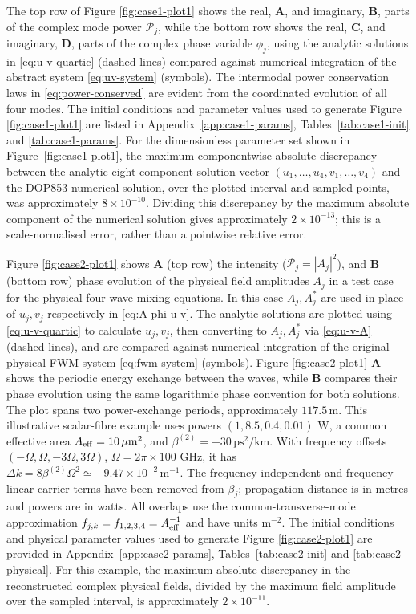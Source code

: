 \documentclass[11pt,a4paper]{article}
\numberwithin{equation}{section}
\begin{document}
The top row of Figure \ref{fig:case1-plot1} shows the real, \textbf{A}, and imaginary, \textbf{B}, parts of the complex mode power $\mathcal{P}_j$,
while the bottom row shows the real, \textbf{C}, and imaginary, \textbf{D}, parts of the complex phase variable $\phi_j$, using the analytic solutions in \eqref{eq:u-v-quartic} (dashed lines) compared against numerical integration of the abstract system \eqref{eq:uv-system} (symbols).
The intermodal power conservation laws in \eqref{eq:power-conserved} are evident from the coordinated evolution of all four modes.
The initial conditions and parameter values used to generate Figure \ref{fig:case1-plot1} are listed in Appendix~\ref{app:case1-params}, Tables~\ref{tab:case1-init} and \ref{tab:case1-params}.
For the dimensionless parameter set shown in Figure~\ref{fig:case1-plot1}, the maximum componentwise absolute discrepancy between the analytic eight-component solution vector $(u_1,\ldots,u_4,v_1,\ldots,v_4)$ and the DOP853 numerical solution, over the plotted interval and sampled points, was approximately $8\times10^{-10}$.
Dividing this discrepancy by the maximum absolute component of the numerical solution gives approximately $2\times10^{-13}$; this is a scale-normalised error, rather than a pointwise relative error.

Figure \ref{fig:case2-plot1} shows \textbf{A} (top row) the intensity ($\mathcal{P}_j=\left|A_j\right|^2$), and \textbf{B} (bottom row) phase evolution of the physical field amplitudes $A_j$ in a test case for the physical four-wave mixing equations.
In this case $A_j, A^*_j$ are used in place of $u_j, v_j$ respectively in \eqref{eq:A-phi-u-v}.
The analytic solutions are plotted using \eqref{eq:u-v-quartic} to calculate $u_j, v_j$, then converting to $A_j, A_j^{*}$ via \eqref{eq:u-v-A} (dashed lines), and are compared against numerical integration of the original physical FWM system \eqref{eq:fwm-system} (symbols).
Figure \ref{fig:case2-plot1} \textbf{A} shows the periodic energy exchange between the waves, while \textbf{B} compares their phase evolution using the same logarithmic phase convention for both solutions.
The plot spans two power-exchange periods, approximately $117.5\,\mathrm m$.
This illustrative scalar-fibre example uses powers $(1,8.5,0.4,0.01)$ W, a common effective area $A_{\rm eff}=10\,\mu\mathrm m^2$, and $\beta^{(2)}=-30\,\mathrm{ps}^2/\mathrm{km}$.
With frequency offsets $(-\Omega,\Omega,-3\Omega,3\Omega)$, $\Omega=2\pi\times100$ GHz, it has $\Delta k=8\beta^{(2)}\Omega^2\simeq-9.47\times10^{-2}\,\mathrm m^{-1}$.
The frequency-independent and frequency-linear carrier terms have been removed from $\beta_j$; propagation distance is in metres and powers are in watts.
All overlaps use the common-transverse-mode approximation $f_{j,k}=f_{1,2,3,4}=A_{\rm eff}^{-1}$ and have units $\mathrm m^{-2}$.
The initial conditions and physical parameter values used to generate Figure \ref{fig:case2-plot1} are provided in Appendix~\ref{app:case2-params}, Tables~\ref{tab:case2-init} and \ref{tab:case2-physical}.
For this example, the maximum absolute discrepancy in the reconstructed complex physical fields, divided by the maximum field amplitude over the sampled interval, is approximately $2\times10^{-11}$.
\end{document}

